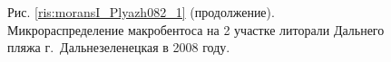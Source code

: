 \documentclass[12pt, a4paper]{disser}
\begin{document}
\begin{figure}[h]
%
%



	\begin{center}
	Рис. \ref{ris:moransI_Plyazh082_1} (продолжение). Микрораспределение макробентоса на 2 участке литорали Дальнего пляжа г.~Дальнезеленецкая в 2008 году.
	\end{center}

\end{figure}
\end{document}
